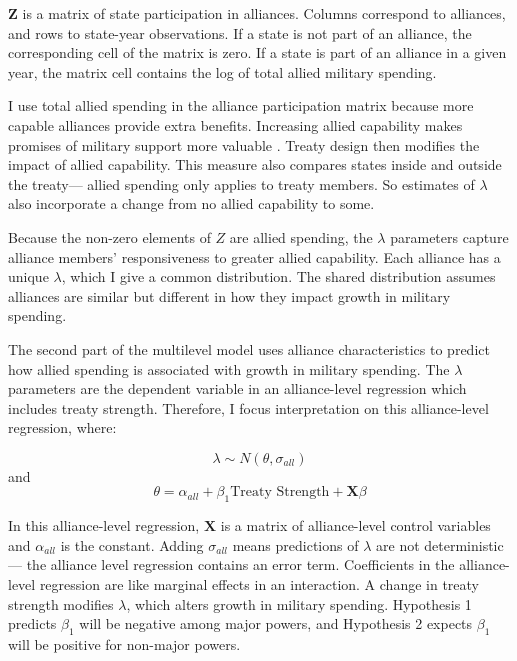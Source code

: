 \documentclass[12pt]{article}
\begin{document}
$\textbf{Z}$ is a matrix of state participation in alliances. 
Columns correspond to alliances, and rows to state-year observations. 
If a state is not part of an alliance, the corresponding cell of the matrix is zero.
If a state is part of an alliance in a given year, the matrix cell contains the log of total allied military spending. 


I use total allied spending in the alliance participation matrix because more capable alliances provide extra benefits.
Increasing allied capability makes promises of military support more valuable \citep{Johnsonetal2015}.  
Treaty design then modifies the impact of allied capability.   
This measure also compares states inside and outside the treaty--- allied spending only applies to treaty members. 
So estimates of $\lambda$ also incorporate a change from no allied capability to some. 

Because the non-zero elements of $Z$ are allied spending, the $\lambda$ parameters capture alliance members' responsiveness to greater allied capability. 
Each alliance has a unique $\lambda$, which I give a common distribution. 
The shared distribution assumes alliances are similar but different in how they impact growth in military spending. 


The second part of the multilevel model uses alliance characteristics to predict how allied spending is associated with growth in military spending. 
The $\lambda$ parameters are the dependent variable in an alliance-level regression which includes treaty strength.
Therefore, I focus interpretation on this alliance-level regression, where: 

\begin{equation}
\lambda \sim N(\theta, \sigma_{all})
\end{equation} 
and 
\begin{equation}
\theta = \alpha_{all} + \beta_1 \mbox{Treaty Strength} + \textbf{X} \beta
\end{equation}

In this alliance-level regression, $\textbf{X}$ is a matrix of alliance-level control variables and $\alpha_{all}$ is the constant.
Adding $\sigma_{all}$ means predictions of $\lambda$ are not deterministic--- the alliance level regression contains an error term. 
Coefficients in the alliance-level regression are like marginal effects in an interaction. 
A change in treaty strength modifies $\lambda$, which alters growth in military spending.
Hypothesis 1 predicts $\beta_1$ will be negative among major powers, and Hypothesis 2 expects $\beta_1$ will be positive for non-major powers.  
\end{document}
